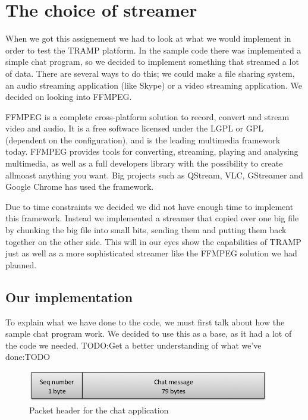
\section{The choice of streamer}
\label{sec:streamer}
When we got this assignement we had to look at what we would implement in order to test the TRAMP platform. In the sample code there was implemented a simple chat program, so we decided to implement something that streamed a lot of data. There are several ways to do this; we could make a file sharing system, an audio streaming application (like Skype) or a video streaming application. We decided on looking into FFMPEG.

FFMPEG is a complete cross-platform solution to record, convert and stream video and audio. It is a free software licensed under the LGPL or GPL (dependent on the configuration), and is the leading multimedia framework today.\cite{FFMPEG-homepage}
FFMPEG provides tools for converting, streaming, playing and analysing multimedia, as well as a full developers library with the possibility to create allmoast anything you want. Big projects such as QStream, VLC, GStreamer and Google Chrome has used the framework.

Due to time constraints we decided we did not have enough time to implement this framework. Instead we implemented a streamer that copied over one big file by chunking the big file into small bits, sending them and putting them back together on the other side. This will in our eyes show the capabilities of TRAMP just as well as a more sophisticated streamer like the FFMPEG solution we had planned.

\subsection{Our implementation}
To explain what we have done to the code, we must first talk about how the sample chat program work. We decided to use this as a base, as it had a lot of the code we needed. 
TODO:Get a better understanding of what we've done:TODO

\begin{figure}[ht!]
\centering
 \includegraphics[width=300pt]{sendchatpkt.png}
\caption{Packet header for the chat application}
\label{Figure:Packet_header_chat}
\end{figure}


